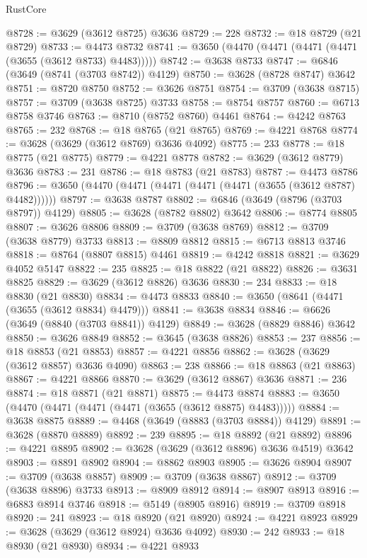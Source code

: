 \begin{lexlean}{RustCore}
\begin{coremodule}
@8728 := @3629 (@3612 @8725) @3636
@8729 := 228
@8732 := @18 @8729 (@21 @8729)
@8733 := @4473 @8732
@8741 := @3650 (@4470 (@4471 (@4471 (@4471 (@3655 (@3612 @8733) @4483)))))
@8742 := @3638 @8733
@8747 := @6846 (@3649 (@8741 (@3703 @8742)) @4129)
@8750 := @3628 (@8728 @8747) @3642
@8751 := @8720 @8750
@8752 := @3626 @8751
@8754 := @3709 (@3638 @8715)
@8757 := @3709 (@3638 @8725) @3733
@8758 := @8754 @8757
@8760 := @6713 @8758 @3746
@8763 := @8710 (@8752 @8760) @4461
@8764 := @4242 @8763
@8765 := 232
@8768 := @18 @8765 (@21 @8765)
@8769 := @4221 @8768
@8774 := @3628 (@3629 (@3612 @8769) @3636 @4092)
@8775 := 233
@8778 := @18 @8775 (@21 @8775)
@8779 := @4221 @8778
@8782 := @3629 (@3612 @8779) @3636
@8783 := 231
@8786 := @18 @8783 (@21 @8783)
@8787 := @4473 @8786
@8796 := @3650 (@4470 (@4471 (@4471 (@4471 (@4471 (@3655 (@3612 @8787) @4482))))))
@8797 := @3638 @8787
@8802 := @6846 (@3649 (@8796 (@3703 @8797)) @4129)
@8805 := @3628 (@8782 @8802) @3642
@8806 := @8774 @8805
@8807 := @3626 @8806
@8809 := @3709 (@3638 @8769)
@8812 := @3709 (@3638 @8779) @3733
@8813 := @8809 @8812
@8815 := @6713 @8813 @3746
@8818 := @8764 (@8807 @8815) @4461
@8819 := @4242 @8818
@8821 := @3629 @4052 @5147
@8822 := 235
@8825 := @18 @8822 (@21 @8822)
@8826 := @3631 @8825
@8829 := @3629 (@3612 @8826) @3636
@8830 := 234
@8833 := @18 @8830 (@21 @8830)
@8834 := @4473 @8833
@8840 := @3650 (@8641 (@4471 (@3655 (@3612 @8834) @4479)))
@8841 := @3638 @8834
@8846 := @6626 (@3649 (@8840 (@3703 @8841)) @4129)
@8849 := @3628 (@8829 @8846) @3642
@8850 := @3626 @8849
@8852 := @3645 (@3638 @8826)
@8853 := 237
@8856 := @18 @8853 (@21 @8853)
@8857 := @4221 @8856
@8862 := @3628 (@3629 (@3612 @8857) @3636 @4090)
@8863 := 238
@8866 := @18 @8863 (@21 @8863)
@8867 := @4221 @8866
@8870 := @3629 (@3612 @8867) @3636
@8871 := 236
@8874 := @18 @8871 (@21 @8871)
@8875 := @4473 @8874
@8883 := @3650 (@4470 (@4471 (@4471 (@4471 (@3655 (@3612 @8875) @4483)))))
@8884 := @3638 @8875
@8889 := @4468 (@3649 (@8883 (@3703 @8884)) @4129)
@8891 := @3628 (@8870 @8889)
@8892 := 239
@8895 := @18 @8892 (@21 @8892)
@8896 := @4221 @8895
@8902 := @3628 (@3629 (@3612 @8896) @3636 @4519) @3642
@8903 := @8891 @8902
@8904 := @8862 @8903
@8905 := @3626 @8904
@8907 := @3709 (@3638 @8857)
@8909 := @3709 (@3638 @8867)
@8912 := @3709 (@3638 @8896) @3733
@8913 := @8909 @8912
@8914 := @8907 @8913
@8916 := @6883 @8914 @3746
@8918 := @5149 (@8905 @8916)
@8919 := @3709 @8918
@8920 := 241
@8923 := @18 @8920 (@21 @8920)
@8924 := @4221 @8923
@8929 := @3628 (@3629 (@3612 @8924) @3636 @4092)
@8930 := 242
@8933 := @18 @8930 (@21 @8930)
@8934 := @4221 @8933

\end{coremodule}
\end{lexlean}
